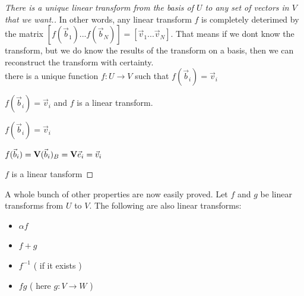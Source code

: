 \begin{proof}[There is a unique linear transform from the basis of $U$ to any set of vectors in $V$ that we want.] In other words, any linear transform $f$ is completely deterimed by the matrix $[ f(\vec{b}_1) ... f(\vec{b}_N) ] = [\vec{v}_1 ... \vec{v}_N]$. That means if we dont know the transform, but we do know the results of the transform on a basis, then we can reconstruct the transform with certainty.  \\

    { there is a unique function $f:U \to V$ such that $f(\vec{b}_i) = \vec{v}_i$ }{
    
        {$f(\vec{b}_i) = \vec{v}_i$ and $f$ is a linear transform.}{
        
            {$f(\vec{b}_i) = \vec{v}_i$}{
                
                $ f(\vec{b}_i) = \mathbf{V} (\vec{b}_i)_B = \mathbf{V} \vec{e}_i = \vec{v}_i $
                
            }
            
            
            {$f$ is a linear tansform}{
            
            }
        }
    }
\end{proof}

A whole bunch of other properties are now easily proved. Let $f$ and $g$ be linear transforms from $U$ to $V$. The following are also linear transforms: 
\begin{itemize}
    \item $\alpha f$
    \item $f + g$
    \item $f^{-1}$ ( if it exists )
    \item $fg$ ( here $g: V \to W$ )
\end{itemize}

